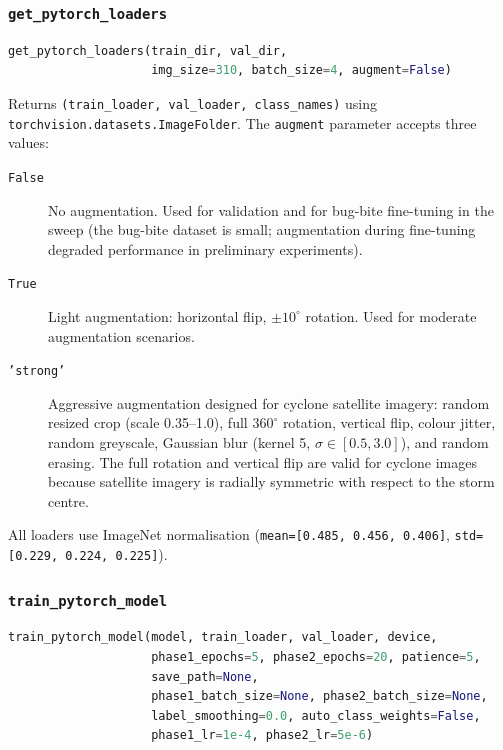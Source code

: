 \documentclass[12pt,a4paper]{article}
\begin{document}
\subsubsection{\texttt{get\_pytorch\_loaders}}

\begin{lstlisting}[language=Python]
get_pytorch_loaders(train_dir, val_dir,
                    img_size=310, batch_size=4, augment=False)
\end{lstlisting}

Returns \texttt{(train\_loader, val\_loader, class\_names)} using
\texttt{torchvision.datasets.ImageFolder}. The \texttt{augment} parameter
accepts three values:

\begin{description}
    \item[\texttt{False}] No augmentation. Used for validation and for
          bug-bite fine-tuning in the sweep (the bug-bite dataset is small;
          augmentation during fine-tuning degraded performance in preliminary
          experiments).
    \item[\texttt{True}] Light augmentation: horizontal flip, $\pm10^{\circ}$
          rotation. Used for moderate augmentation scenarios.
    \item[\texttt{'strong'}] Aggressive augmentation designed for cyclone
          satellite imagery: random resized crop (scale 0.35--1.0), full
          $360^{\circ}$ rotation, vertical flip, colour jitter, random greyscale,
          Gaussian blur (kernel 5, $\sigma \in [0.5, 3.0]$), and random erasing.
          The full rotation and vertical flip are valid for cyclone images because
          satellite imagery is radially symmetric with respect to the storm centre.
\end{description}

All loaders use ImageNet normalisation
(\texttt{mean=[0.485, 0.456, 0.406]}, \texttt{std=[0.229, 0.224, 0.225]}).

\subsubsection{\texttt{train\_pytorch\_model}}

\begin{lstlisting}[language=Python]
train_pytorch_model(model, train_loader, val_loader, device,
                    phase1_epochs=5, phase2_epochs=20, patience=5,
                    save_path=None,
                    phase1_batch_size=None, phase2_batch_size=None,
                    label_smoothing=0.0, auto_class_weights=False,
                    phase1_lr=1e-4, phase2_lr=5e-6)
\end{lstlisting}
\end{document}
